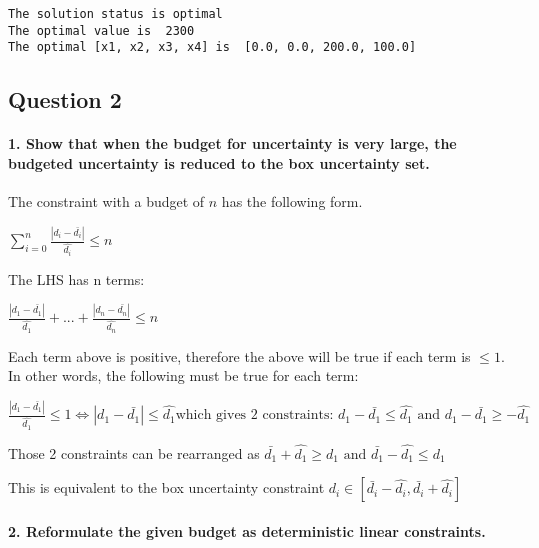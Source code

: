 \documentclass[11pt]{article}
\begin{document}
    \begin{Verbatim}[commandchars=\\\{\}]
The solution status is optimal
The optimal value is  2300
The optimal [x1, x2, x3, x4] is  [0.0, 0.0, 200.0, 100.0]

    \end{Verbatim}

    \hypertarget{question-2}{%
\subsection{Question 2}\label{question-2}}

\hypertarget{show-that-when-the-budget-for-uncertainty-is-very-large-the-budgeted-uncertainty-is-reduced-to-the-box-uncertainty-set.}{%
\paragraph{1. Show that when the budget for uncertainty is very large,
the budgeted uncertainty is reduced to the box uncertainty
set.}\label{show-that-when-the-budget-for-uncertainty-is-very-large-the-budgeted-uncertainty-is-reduced-to-the-box-uncertainty-set.}}

The constraint with a budget of \(n\) has the following form.

\(\sum_{i=0}^{n} \frac{|d_i - \bar{d_i}|}{\hat{d_i}} \le n\)

The LHS has n terms:

\(\frac{|d_1 - \bar{d_1}|}{\hat{d_1}} + ... + \frac{|d_n - \bar{d_n}|}{\hat{d_n}} \le n\)

Each term above is positive, therefore the above will be true if each
term is \(\le 1\). In other words, the following must be true for each
term:

\(\frac{|d_1 - \bar{d_1}|}{\hat{d_1}} \le 1 \Leftrightarrow |d_1 - \bar{d_1}| \le \hat{d_1} \text{which gives 2 constraints:  } d_1 - \bar{d_1} \le \hat{d_1} \text{ and } d_1 - \bar{d_1} \ge -\hat{d_1}\)

Those 2 constraints can be rearranged as
\(\bar{d_1} + \hat{d_1} \ge d_1 \text{ and } \bar{d_1} - \hat{d_1} \le d_1\)

This is equivalent to the box uncertainty constraint
\(d_i \in [\bar{d_i} - \hat{d_i}, \bar{d_i} + \hat{d_i}]\)

\hypertarget{reformulate-the-given-budget-as-deterministic-linear-constraints.}{%
\paragraph{2. Reformulate the given budget as deterministic linear
constraints.}\label{reformulate-the-given-budget-as-deterministic-linear-constraints.}}
\end{document}
